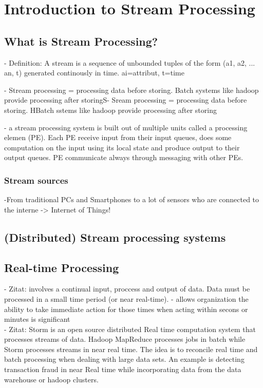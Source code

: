 \chapter{Introduction to Stream Processing}
\section{What is Stream Processing?}
- Definition: A stream is a sequence of unbounded tuples of the form (a1, a2,
... an, t) generated continously in time. ai=attribut, t=time

- Stream processing = processing data before storing. Batch systems like hadoop
provide processing after storingS- Sream processing = processing data before
storing. HBatch sstems like hadoop provide processing after storing  

- a stream processing system is built out of multiple units called a processing
elemen (PE). Each PE receive input from their input queues, does some
computation on the input using its local state and produce output to their
output queues. PE communicate always through messaging with other PEs.

\subsection{Stream sources}
-From traditional PCs and Smartphones to a lot of sensors who are connected to
the interne -> Internet of Things!

\section{(Distributed) Stream processing systems}

\section{Real-time Processing}
- Zitat: involves a continual input, proccess and output of data. Data must be
processed in a small time period (or near real-time). 
- allows organization the ability to take immediate action for those times when
acting within secons or minutes is significant\\

- Zitat: Storm is an open source distributed Real time computation system that
processes streams of data. Hadoop MapReduce processes jobs in batch while
Storm processes streams in near real time. The idea is to reconcile real time
and batch processing when dealing with large data sets. An example is detecting
transaction fraud in near Real time while incorporating data from the data
warehouse or hadoop clusters.\\

